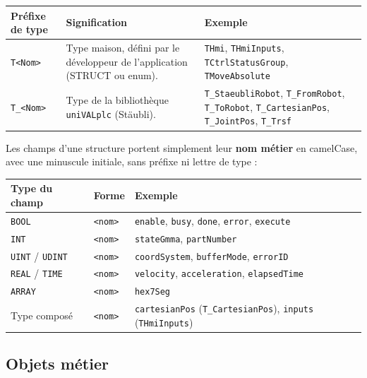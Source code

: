 \begin{center}
    \begin{tabular}{|p{2.8cm}|p{6.5cm}|p{5cm}|}
        \hline
        \textbf{Préfixe de type} & \textbf{Signification} & \textbf{Exemple} \\
        \hline
        \texttt{T<Nom>} & Type maison, défini par le développeur de l'application (STRUCT ou enum). & \texttt{THmi}, \texttt{THmiInputs}, \texttt{TCtrlStatusGroup}, \texttt{TMoveAbsolute} \\
        \hline
        \texttt{T\_<Nom>} & Type de la bibliothèque \texttt{uniVALplc} (Stäubli). & \texttt{T\_StaeubliRobot}, \texttt{T\_FromRobot}, \texttt{T\_ToRobot}, \texttt{T\_CartesianPos}, \texttt{T\_JointPos}, \texttt{T\_Trsf} \\
        \hline
    \end{tabular}
\end{center}

Les champs d'une structure portent simplement leur \textbf{nom métier} en camelCase, avec une
minuscule initiale, sans préfixe ni lettre de type :

\begin{center}
    \begin{tabular}{|p{2.8cm}|p{3.2cm}|p{8.3cm}|}
        \hline
        \textbf{Type du champ} & \textbf{Forme} & \textbf{Exemple} \\
        \hline
        \texttt{BOOL} & \texttt{<nom>} & \texttt{enable}, \texttt{busy}, \texttt{done}, \texttt{error}, \texttt{execute} \\
        \hline
        \texttt{INT} & \texttt{<nom>} & \texttt{stateGmma}, \texttt{partNumber} \\
        \hline
        \texttt{UINT} / \texttt{UDINT} & \texttt{<nom>} & \texttt{coordSystem}, \texttt{bufferMode}, \texttt{errorID} \\
        \hline
        \texttt{REAL} / \texttt{TIME} & \texttt{<nom>} & \texttt{velocity}, \texttt{acceleration}, \texttt{elapsedTime} \\
        \hline
        \texttt{ARRAY} & \texttt{<nom>} & \texttt{hex7Seg} \\
        \hline
        Type composé & \texttt{<nom>} & \texttt{cartesianPos} (\texttt{T\_CartesianPos}), \texttt{inputs} (\texttt{THmiInputs}) \\
        \hline
    \end{tabular}
\end{center}

\subsection{Objets métier}
\label{secNotationsObjets}

